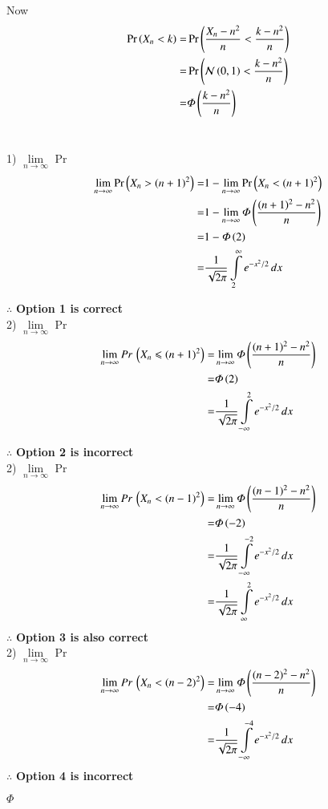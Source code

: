\documentclass[journal,12pt,twocolumn]{IEEEtran}
\begin{document}
Now 
{
\begin{align}
    \Pr\left(X_n<k\right) =& \Pr\left(\frac{X_n-n^2}{n}<\frac{k-n^2}{n}\right)
    \\=& \Pr\left(\mathcal{N}\left(0,1\right)<\frac{k-n^2}{n}\right)
    \\ =& \varPhi\left(\frac{k-n^2}{n}\right)
    \label{eq-cdf}
\end{align}
}
\\[4ex]
{
\small
1) $\lim \limits_{n \to \infty} $ Pr\,
\begin{align}
    \lim \limits_{n \to \infty}\Pr\left(X_n > (n+1)^2\right) =& 1- \lim \limits_{n \to \infty}\Pr\left(X_n < (n+1)^2\right)
    \\=&1-\lim \limits_{n \to \infty}\varPhi \left(\frac{(n+1)^2-n^2}{n}\right)
    \\=&1-\varPhi \left(2\right)
    \\=& {\frac{1}{\sqrt{2\pi}} \int \limits_{2}^{\infty} e^{-x^2/2}\,dx}
\end{align}

$\mathbf{\therefore}$ \textbf{Option 1 is correct}
\\[4ex]2) $\lim \limits_{n \to \infty} $ Pr\,
\begin{align}
    \lim \limits_{n \to \infty}  Pr\,\left(X_n \leqslant (n+1)^2\right) =& \lim \limits_{n \to \infty}\varPhi \left(\frac{(n+1)^2-n^2}{n}\right)
    \\=& \varPhi \left(2\right)
    \\=& {\frac{1}{\sqrt{2\pi}} \int \limits_{-\infty}^{2} e^{-x^2/2}\,dx}
\end{align}

$\mathbf{\therefore}$ \textbf{Option 2 is incorrect}
\\[4ex]2) $\lim \limits_{n \to \infty} $ Pr\,
\begin{align}
    \lim \limits_{n \to \infty}  Pr\,\left(X_n < (n-1)^2\right) =& \lim \limits_{n \to \infty}\varPhi \left(\frac{(n-1)^2-n^2}{n}\right)
    \\=& \varPhi \left(-2\right)
    \\=& {\frac{1}{\sqrt{2\pi}} \int \limits_{-\infty}^{-2} e^{-x^2/2}\,dx}
    \\=& {\frac{1}{\sqrt{2\pi}} \int \limits_{\infty}^{2} e^{-x^2/2}\,dx}
\end{align}
$\mathbf{\therefore}$ \textbf{Option 3 is also correct}
\\[4ex]2) $\lim \limits_{n \to \infty} $ Pr\,
\begin{align}
    \lim \limits_{n \to \infty}  Pr\,\left(X_n < (n-2)^2\right) =& \lim \limits_{n \to \infty}\varPhi \left(\frac{(n-2)^2-n^2}{n}\right)
    \\=& \varPhi \left(-4\right)
    \\=& {\frac{1}{\sqrt{2\pi}} \int \limits_{-\infty}^{-4} e^{-x^2/2}\,dx}
\end{align}
$\mathbf{\therefore}$ \textbf{Option 4 is incorrect}
}%
$\varPhi$
\end{document}
